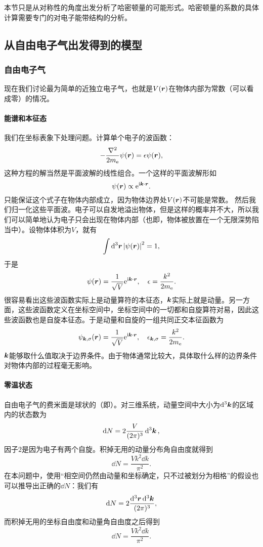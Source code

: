 本节只是从对称性的角度出发分析了哈密顿量的可能形式。哈密顿量的系数的具体计算需要专门的对电子能带结构的分析。

\subsection{从自由电子气出发得到的模型}

\subsubsection{自由电子气}

现在我们讨论最为简单的近独立电子气，也就是$V(\vb*{r})$在物体内部为常数（可以看成零）的情况。

\paragraph{能谱和本征态} 我们在坐标表象下处理问题。计算单个电子的波函数：
\[
    - \frac{\laplacian}{2m_\text{e}} \psi(\vb*{r}) = \epsilon \psi(\vb*{r}),
\]
这种方程的解当然是平面波解的线性组合。一个这样的平面波解形如
\[
    \psi(\vb*{r}) \propto \mathrm{e}^{\mathrm{i} \vb*{k} \cdot \vb*{r}}.
\]
只能保证这个式子在物体内部成立，因为物体边界处$V(\vb*{r})$不可能是常数。
然后我们归一化这些平面波。电子可以自发地溢出物体，但是这样的概率并不大，所以我们可以简单地认为电子只会出现在物体内部（也即，物体被放置在一个无限深势陷当中）。设物体体积为$V$，就有
\[
    \int \dd[3]{\vb*{r}} \abs{\psi(\vb*{r})}^2 = 1,
\]
于是
\[
    \psi (\vb*{r}) = \frac{1}{\sqrt{V}} \mathrm{e}^{\mathrm{i} \vb*{k} \cdot \vb*{r}}, \quad \epsilon = \frac{k^2}{2m_\text{e}}.
\]
很容易看出这些波函数实际上是动量算符的本征态，$\vb*{k}$实际上就是动量。另一方面，这些波函数定义在坐标空间中，坐标空间中的一切都和自旋算符对易，因此这些波函数也是自旋本征态。于是动量和自旋的一组共同正交本征函数为
\begin{equation}
    \psi_{\vb*{k},\sigma} (\vb*{r}) = \frac{1}{\sqrt{V}} \mathrm{e}^{\mathrm{i} \vb*{k} \cdot \vb*{r}}, \quad \epsilon_{\vb*{k},\sigma} = \frac{k^2}{2m_\text{e}}.
\end{equation}
$\vb*{k}$能够取什么值取决于边界条件。由于物体通常比较大，具体取什么样的边界条件对物体内部的过程毫无影响。

\paragraph{零温状态} 自由电子气的费米面是球状的（即）。对三维系统，动量空间中大小为$\dd[3]{\vb*{k}}$的区域内的状态数为
\begin{equation}
    \dd{N} = 2 \frac{V}{(2\pi)^3} \dd[3]{\vb*{k}},
\end{equation}
因子$2$是因为电子有两个自旋。积掉无用的动量分布角自由度就得到
\begin{equation}
    \dd{N} = \frac{V k^2 \dd{k}}{\pi^2}.
\end{equation}
在本问题中，使用“相空间仍然由动量和坐标确定，只不过被划分为相格”的假设也可以推导出正确的$\dd{N}$：我们有
\[
    \dd{N} = 2 \frac{\dd[3]{\vb*{r}} \dd[3]{\vb*{k}}}{(2\pi)^3},
\]
而积掉无用的坐标自由度和动量角自由度之后得到
\[
    \dd{N} = \frac{V k^2 \dd{k}}{\pi^2}.
\]

